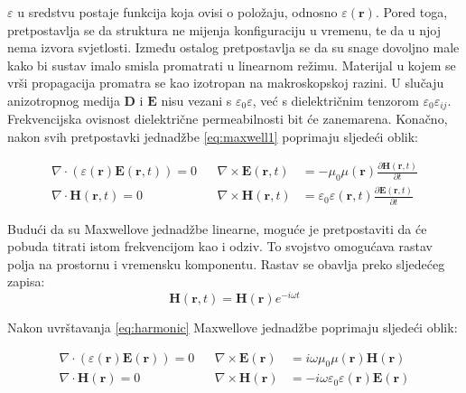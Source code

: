\documentclass[utf8, seminar]{fer}
\begin{document}
$\varepsilon$ u sredstvu postaje funkcija koja ovisi o položaju, odnosno
$\varepsilon(\mathbf{r})$. Pored toga, pretpostavlja se da struktura ne mijenja
konfiguraciju u vremenu, te da u njoj nema izvora svjetlosti. Između ostalog
pretpostavlja se da su snage dovoljno male kako bi sustav imalo smisla promatrati
u linearnom režimu.
Materijal u kojem se vrši propagacija promatra se kao izotropan na makroskopskoj
razini. U slučaju anizotropnog medija $\mathbf{D}$ i $\mathbf{E}$ nisu vezani
s $\varepsilon_0 \varepsilon$, već s
dielektričnim tenzorom $\varepsilon_0 \varepsilon_{ij}$. Frekvencijska
ovisnost dielektrične permeabilnosti bit će zanemarena. Konačno, nakon svih
pretpostavki jednadžbe \ref{eq:maxwell1} poprimaju sljedeći oblik:

\begin{align} \label{eq:maxwell2}
	\nabla \cdot (\varepsilon(\mathbf{r}) \mathbf{E}(\mathbf{r}, t)) = 0 &&
	\nabla \times \mathbf{E}(\mathbf{r}, t) &=
		- \mu_0 \mu(\mathbf{r})
		\frac{\partial \mathbf{H}(\mathbf{r}, t)}{\partial t}  \nonumber \\
	\nabla \cdot \mathbf{H}(\mathbf{r}, t) = 0 &&
	\nabla \times \mathbf{H}(\mathbf{r}, t) &=
		\varepsilon_0 \varepsilon(\mathbf{r}, t)
		\frac{\partial \mathbf{E}(\mathbf{r}, t)}{\partial t}
\end{align}

Budući da su Maxwellove jednadžbe linearne, moguće je pretpostaviti da će pobuda
titrati istom frekvencijom kao i odziv. To svojstvo omogućava rastav polja
na prostornu i vremensku komponentu. Rastav se obavlja preko sljedećeg zapisa:
\begin{equation} \label{eq:harmonic}
	\mathbf{H}(\mathbf{r}, t) = \mathbf{H}(\mathbf{r}) e^{-i \omega t}
\end{equation}

Nakon uvrštavanja \ref{eq:harmonic} Maxwellove jednadžbe poprimaju sljedeći
oblik:

\begin{align} \label{eq:maxwell3}
	\nabla \cdot (\varepsilon(\mathbf{r}) \mathbf{E}(\mathbf{r})) = 0 &&
	\nabla \times \mathbf{E}(\mathbf{r}) &=
		i \omega \mu_0 \mu(\mathbf{r})\mathbf{H}(\mathbf{r})  \nonumber \\
	\nabla \cdot \mathbf{H}(\mathbf{r}) = 0 &&
	\nabla \times \mathbf{H}(\mathbf{r}) &=
		- i \omega \varepsilon_0 \varepsilon(\mathbf{r})\mathbf{E}(\mathbf{r})
\end{align}
\end{document}
